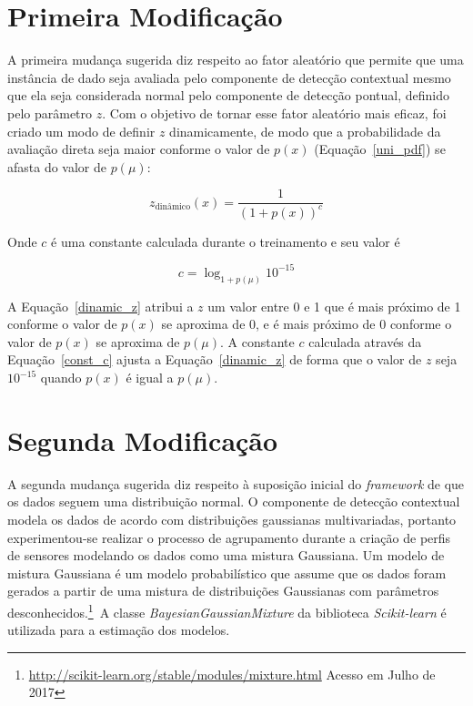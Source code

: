 \documentclass[cic,tc]{iiufrgs}
\begin{document}
\section{Primeira Modificação}
\label{mod_1}
A primeira mudança sugerida diz respeito ao fator aleatório que permite que uma instância de dado seja avaliada pelo componente de detecção contextual mesmo que ela seja considerada normal pelo componente de detecção pontual, definido pelo parâmetro $z$. Com o objetivo de tornar esse fator aleatório mais eficaz, foi criado um modo de definir $z$ dinamicamente, de modo que a probabilidade da avaliação direta seja maior conforme o valor de $p(x)$ (Equação~\ref{uni_pdf}) se afasta do valor de $p(\mu)$:

\begin{equation}
    \label{dinamic_z}
    z_{\textrm{dinâmico}}(x) = \frac{1}{(1 + p(x))^{c}}
\end{equation}

Onde $c$ é uma constante calculada durante o treinamento e seu valor é

\begin{equation}
    \label{const_c}
    c = \log_{1 + p(\mu)} 10^{-15}
\end{equation}

A Equação~\ref{dinamic_z} atribui a $z$ um valor entre 0 e 1 que é mais próximo de 1 conforme o valor de $p(x)$ se aproxima de 0, e é mais próximo de 0 conforme o valor de $p(x)$ se aproxima de $p(\mu)$. A constante $c$ calculada através da Equação~\ref{const_c} ajusta a Equação~\ref{dinamic_z} de forma que o valor de $z$ seja $10^{-15}$ quando $p(x)$ é igual a $p(\mu)$.

\section{Segunda Modificação}
\label{mod_2}
A segunda mudança sugerida diz respeito à suposição inicial do \textit{framework} de que os dados seguem uma distribuição normal. O componente de detecção contextual modela os dados de acordo com distribuições gaussianas multivariadas, portanto experimentou-se realizar o processo de agrupamento durante a criação de perfis de sensores modelando os dados como uma mistura Gaussiana. Um modelo de mistura Gaussiana é um modelo probabilístico que assume que os dados foram gerados a partir de uma mistura de distribuições Gaussianas com parâmetros desconhecidos.\footnote{\url{http://scikit-learn.org/stable/modules/mixture.html} Acesso em Julho de 2017}~A classe \textit{BayesianGaussianMixture} da biblioteca \textit{Scikit-learn} é utilizada para a estimação dos modelos.
\end{document}
